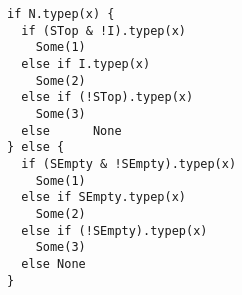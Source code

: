 \begin{lstlisting}[style=reclojureScala]
if N.typep(x) {
  if (STop & !I).typep(x)
    Some(1)
  else if I.typep(x)
    Some(2)
  else if (!STop).typep(x)
    Some(3)
  else      None
} else {
  if (SEmpty & !SEmpty).typep(x)
    Some(1)
  else if SEmpty.typep(x)
    Some(2)
  else if (!SEmpty).typep(x)
    Some(3)
  else None
}
\end{lstlisting}
